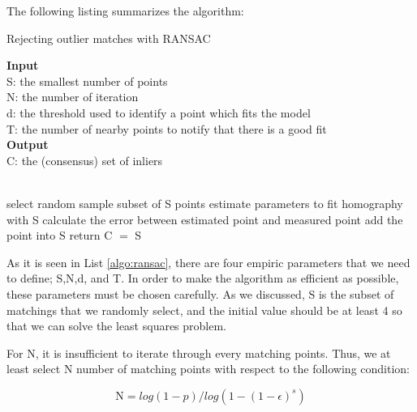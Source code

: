 \documentclass[a4paper]{report}
\numberwithin{figure}{section}
\begin{document}
\begin{appendices}
The following listing summarizes the algorithm:

\begin{algorithm}[H]
	\caption{Rejecting outlier matches with RANSAC}
	\label{algo:ransac}
	\textbf{Input} \\
	\hspace*{\algorithmicindent}S: the smallest number of points\\
	\hspace*{\algorithmicindent}N: the number of iteration\\
	\hspace*{\algorithmicindent}d: the threshold used to identify a point 
	which fits the model\\
	\hspace*{\algorithmicindent}T: the number of nearby points to notify that 
	there is a good fit\\
	\textbf{Output} \\
	\hspace*{\algorithmicindent}C: the (consensus) set of inliers \\
	\begin{algorithmic}[1]
		
		\\
		\State select random sample subset of S points
		\State estimate parameters to fit homography with S
		\State calculate the error between estimated point and measured point
		\State add the point into S
		\EndIf
		\State return C $=$ S
		\EndIf
		\EndFor
		\EndWhile
		\EndProcedure
	\end{algorithmic}
\end{algorithm}

As it is seen in List \ref{algo:ransac}, there are four empiric parameters 
that we 
need to define; S,N,d, and T. In order to make the algorithm as efficient as 
possible, these parameters must be chosen carefully. As we discussed, S is the 
subset of matchings that we randomly select, and the initial value should be 
at 
least 4 so that we can solve the least squares problem. 

For N, it is insufficient to iterate through every matching points. Thus, we 
at least select N number of matching points with respect to the following 
condition:

\begin{equation}
\text{N} = log(1-p)/log(1-(1-\epsilon)^s)
\end{equation}


\end{appendices}
\end{document}
